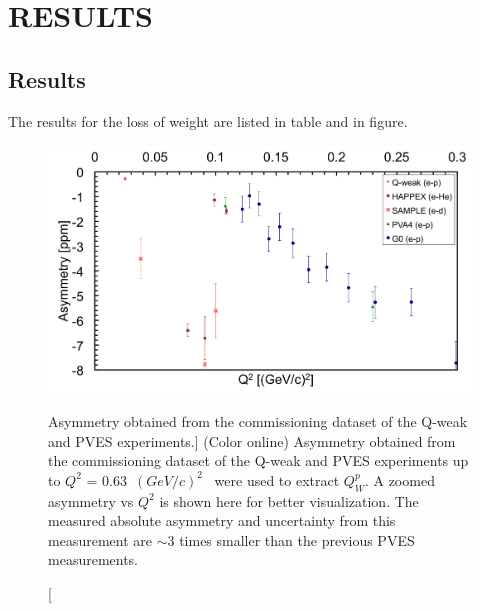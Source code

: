 \chapter{RESULTS}
\label{RESULTS}

\section{Results}
The results for the loss of weight are listed in table and in figure.



\begin{singlespace}
\begin{figure}[!h]
	\begin{center}
	\includegraphics[width=15.0cm]{figures/qweak_asymmetry_zoomed}
	\end{center}
	\caption
	[Asymmetry obtained from the commissioning dataset of the Q-weak and PVES experiments.]
	{(Color online) Asymmetry obtained from the commissioning dataset of the Q-weak and PVES experiments up to $Q^{2}$ = 0.63~$(GeV/c)^{2}$~\cite{PhysRevC.69.065501, PhysRevLett.82.1096, PhysRevLett.96.022003, Aniol2006275, PhysRevLett.98.032301, PhysRevLett.108.102001, Spayde200479, PhysRevLett.92.102003, PhysRevLett.95.092001, PhysRevLett.104.012001, PhysRevLett.93.022002, PhysRevLett.94.152001, PhysRevLett.102.151803, PhysRevD.86.010001, PhysRevLett.109.203003, Wood21031997, PhysRevLett.111.141803} were used to extract $Q_{W}^{p}$. A zoomed asymmetry vs $Q^{2}$ is shown here for better visualization. The measured absolute asymmetry and uncertainty from this measurement are $\sim$3 times smaller than the previous PVES measurements.}
	\label{fig:qweak_asymmetry_zoomed}
\end{figure}
\end{singlespace}


